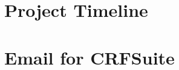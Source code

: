 %
%

\chapter{Project Timeline}
\label{sec:timeline}


\chapter{Email for CRFSuite}
\label{sec:crfemail}

